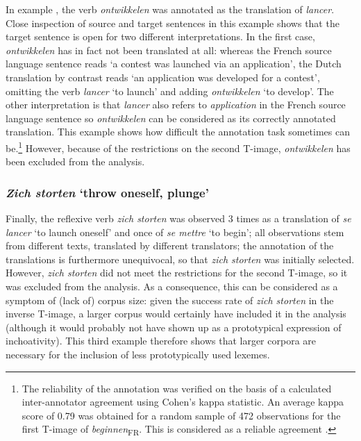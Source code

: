 In example , the verb \textit{ontwikkelen} was annotated as the translation of \textit{lancer}. Close inspection of source and target sentences in this example shows that the target sentence is open for two different interpretations. In the first case, \textit{ontwikkelen} has in fact not been translated at all: whereas the French source language sentence reads ‘a contest was launched via an application’, the Dutch translation by contrast reads ‘an application was developed for a contest’, omitting the verb \textit{lancer} `to launch' and adding \textit{ontwikkelen} `to develop'. The other interpretation is that \textit{lancer} also refers to \textit{application} in the French source language sentence so \textit{ontwikkelen} can be considered as its correctly annotated translation. This example shows how difficult the annotation task sometimes can be.\footnote{The reliability of the annotation was verified on the basis of a calculated inter-annotator agreement using Cohen’s kappa statistic. An average kappa score of 0.79 was obtained for a random sample of 472 observations for the first T-image of \textit{beginnen}\textsubscript{FR}. This is considered as a reliable agreement  \citep{carletta_assessing_1996}.} However, because of the restrictions on the second T-image, \textit{ontwikkelen} has been excluded from the analysis.

\subsubsection{\textit{Zich storten} `throw oneself, plunge'}

Finally, the reflexive verb \textit{zich storten} was observed 3 times as a translation of \textit{se lancer} `to launch oneself' and once of \textit{se mettre} `to begin'; all observations stem from different texts, translated by different translators; the annotation of the translations is furthermore unequivocal, so that \textit{zich storten} was initially selected. However, \textit{zich storten} did not meet the restrictions for the second T-image, so it was excluded from the analysis. As a consequence, this can be considered as a symptom of (lack of) corpus size: given the success rate of \textit{zich storten} in the inverse T-image, a larger corpus would certainly have included it in the analysis (although it would probably not have shown up as a prototypical expression of inchoativity). This third example therefore shows that larger corpora are necessary for the inclusion of less prototypically used lexemes.

